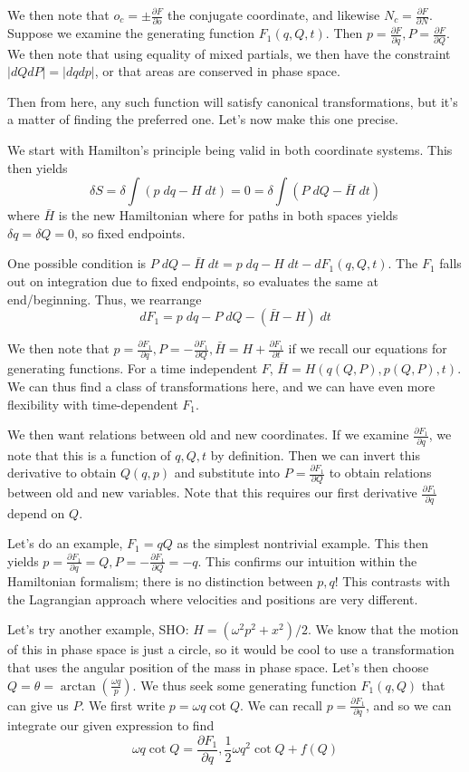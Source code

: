 \documentclass[10pt]{report}
\newcommand{\pd}[2]{\frac{\partial #1}{\partial#2}}
\newcommand{\abs}[1]{\left|#1\right|}
\begin{document}
We then note that $o_c = \pm \pd{F}{o}$ the conjugate coordinate, and likewise $N_c = \pd{F}{N}$. Suppose we examine the generating function $F_1(q,Q,t)$. Then $p = \pd{F}{q}, P = \pd{F}{Q}$. We then note that using equality of mixed partials, we then have the constraint $\abs{dQdP} = \abs{dq dp}$, or that areas are conserved in phase space. 

Then from here, any such function will satisfy canonical transformations, but it's a matter of finding the preferred one. Let's now make this one precise.

We start with Hamilton's principle being valid in both coordinate systems. This then yields
$$\delta S = \delta \int \left( p\; dq - H\; dt \right) = 0 = \delta \int \left( P \; dQ - \bar{H}\; dt \right)$$
where $\bar{H}$ is the new Hamiltonian where for paths in both spaces yields $\delta q = \delta Q = 0$, so fixed endpoints.

One possible condition is $P\; dQ - \bar{H} \;  dt = p\; dq - H\; dt - dF_1\left( q,Q,t \right)$. The $F_1$ falls out on integration due to fixed endpoints, so evaluates the same at end/beginning. Thus, we rearrange
$$dF_1 = p\; dq - P\; dQ - (\bar{H} - H)\; dt$$

We then note that $p=\pd{F_1}{q}, P= - \pd{F_1}{Q}, \bar{H} = H+ \pd{F_1}{t}$ if we recall our equations for generating functions. For a time independent $F$, $\bar{H} = H(q(Q,P),p(Q,P),t)$. We can thus find a class of transformations here, and we can have even more flexibility with time-dependent $F_1$. 

We then want relations between old and new coordinates. If we examine $\pd{F_1}{q}$, we note that this is a function of $q,Q,t$ by definition. Then we can invert this derivative to obtain $Q(q,p)$ and substitute into $P=\pd{F_1}{Q}$ to obtain relations between old and new variables. Note that this requires our first derivative $\pd{F_1}{q}$ depend on $Q$.

Let's do an example, $F_1 = qQ$ as the simplest nontrivial example. This then yields $p=\pd{F_1}{q} = Q, P = -\pd{F_1}{Q} = -q$. This confirms our intuition within the Hamiltonian formalism; there is no distinction between $p,q$! This contrasts with the Lagrangian approach where velocities and positions are very different.

Let's try another example, SHO: $H = (\omega^2p^2 + x^2)/2$. We know that the motion of this in phase space is just a circle, so it would be cool to use a transformation that uses the angular position of the mass in phase space. Let's then choose $Q = \theta = \arctan\left( \frac{\omega q}{p} \right)$. We thus seek some generating function $F_1(q,Q)$ that can give us $P$. We first write $p=\omega q \cot Q$. We can recall $p = \pd{F_1}{q}$, and so we can integrate our given expression to find
$$\omega q \cot Q = \pd{F_1}{q}, \frac{1}{2}\omega q^2\cot Q + f(Q)$$
\end{document}
